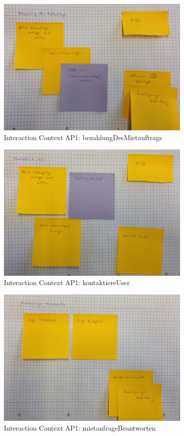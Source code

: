 \begin{figure}[H]
\centering
\includegraphics[width=0.85\textwidth]{./images/abstract/version1/bezahlungDesMietauftrags.JPG}
\caption{Interaction Context AP1: bezahlungDesMietauftrags}
\label{interfaceContents24}
\end{figure}

\begin{figure}[H]
\centering
\includegraphics[width=0.85\textwidth]{./images/abstract/version1/kontaktiereUser.JPG}
\caption{Interaction Context AP1: kontaktiereUser}
\label{interfaceContents25}
\end{figure}


\begin{figure}[H]
\centering
\includegraphics[width=0.85\textwidth]{./images/abstract/version1/mietanfrageBeantworten.JPG}
\caption{Interaction Context AP1: mietanfrageBeantworten}
\label{interfaceContents26}
\end{figure}

